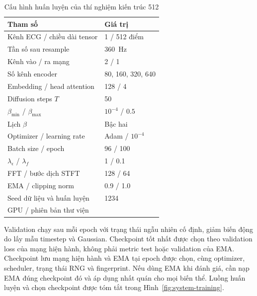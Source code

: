 \documentclass[conference]{IEEEtran}
\newcommand{\pending}{\textemdash}
\begin{document}
\begin{table}[t]
 \caption{Cấu hình huấn luyện của thí nghiệm kiến trúc 512}
 \label{tab:config}
 \centering\small
 \begin{tabular}{@{}ll@{}}
 \toprule
 Tham số & Giá trị\\
 \midrule
 Kênh ECG / chiều dài tensor & 1 / 512 điểm\\
 Tần số sau resample & 360~Hz\\
 Kênh vào / ra mạng & 2 / 1\\
 Số kênh encoder & 80, 160, 320, 640\\
 Embedding / head attention & 128 / 4\\
 Diffusion steps $T$ & 50\\
 $\beta_{\min}$ / $\beta_{\max}$ & $10^{-4}$ / $0.5$\\
 Lịch $\beta$ & Bậc hai\\
 Optimizer / learning rate & Adam / $10^{-4}$\\
 Batch size / epoch & 96 / 100\\
 $\lambda_{\epsilon}$ / $\lambda_f$ & 1 / 0.1\\
 FFT / bước dịch STFT & 128 / 64\\
 EMA / clipping norm & 0.9 / 1.0\\
 Seed dữ liệu và huấn luyện & 1234\\
 GPU / phiên bản thư viện & \pending\\
 \bottomrule
 \end{tabular}
\end{table}

Validation chạy sau mỗi epoch với trạng thái ngẫu nhiên cố định, giảm biến động do lấy mẫu timestep và Gaussian. Checkpoint tốt nhất được chọn theo validation loss của mạng hiện hành, không phải metric test hoặc validation của EMA. Checkpoint lưu mạng hiện hành và EMA tại epoch được chọn, cùng optimizer, scheduler, trạng thái RNG và fingerprint. Nếu dùng EMA khi đánh giá, cần nạp EMA đúng checkpoint đó và áp dụng nhất quán cho mọi biến thể. Luồng huấn luyện và chọn checkpoint được tóm tắt trong Hình~\ref{fig:system-training}.
\end{document}
